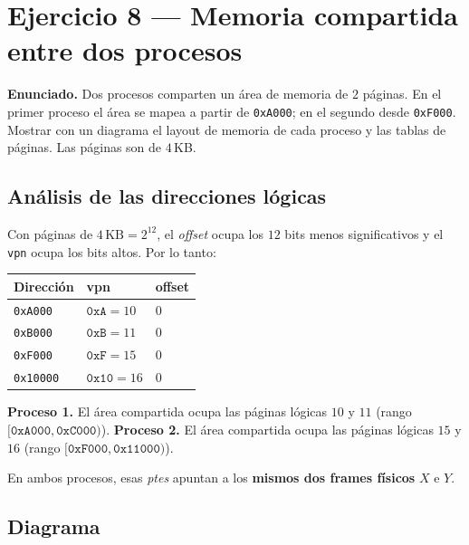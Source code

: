 \documentclass[11pt,a4paper]{article}
\begin{document}
\section{Ejercicio 8 --- Memoria compartida entre dos procesos}

\textbf{Enunciado.} Dos procesos comparten un área de memoria de $2$
páginas. En el primer proceso el área se mapea a partir de
\texttt{0xA000}; en el segundo desde \texttt{0xF000}. Mostrar con un
diagrama el layout de memoria de cada proceso y las tablas de páginas.
Las páginas son de $4$\,KB.

\subsection{Análisis de las direcciones lógicas}

Con páginas de $4\,\text{KB} = 2^{12}$, el \emph{offset} ocupa los
$12$ bits menos significativos y el \texttt{vpn} ocupa los bits altos.
Por lo tanto:

\begin{center}
\small
\begin{tabular}{@{}lll@{}}
\toprule
Dirección & vpn & offset \\
\midrule
\texttt{0xA000} & $\texttt{0xA} = 10$ & $0$ \\
\texttt{0xB000} & $\texttt{0xB} = 11$ & $0$ \\
\texttt{0xF000} & $\texttt{0xF} = 15$ & $0$ \\
\texttt{0x10000} & $\texttt{0x10} = 16$ & $0$ \\
\bottomrule
\end{tabular}
\end{center}

\textbf{Proceso 1.} El área compartida ocupa las páginas lógicas
$10$ y $11$ (rango $[\texttt{0xA000}, \texttt{0xC000})$).
\textbf{Proceso 2.} El área compartida ocupa las páginas lógicas
$15$ y $16$ (rango $[\texttt{0xF000}, \texttt{0x11000})$).

En ambos procesos, esas \emph{ptes} apuntan a los \textbf{mismos dos
frames físicos} $X$ e $Y$.

\subsection{Diagrama}
\end{document}
